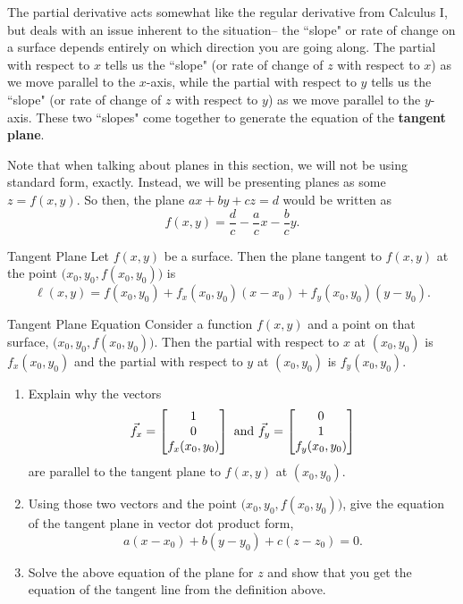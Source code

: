 The partial derivative acts somewhat like the regular derivative from Calculus I, but deals with an issue inherent to the situation-- the ``slope" or rate of change on a surface depends entirely on which direction you are going along. The partial with respect to $x$ tells us the ``slope" (or rate of change of $z$ with respect to $x$) as we move parallel to the $x$-axis, while the partial with respect to $y$ tells us the ``slope" (or rate of change of $z$ with respect to $y$) as we move parallel to the $y$-axis. These two ``slopes" come together to generate the equation of the \textbf{tangent plane}.

Note that when talking about planes in this section, we will not be using standard form, exactly. Instead, we will be presenting planes as some $z=f(x,y)$. So then, the plane $ax+by+cz=d$ would be written as $$f(x,y)=\frac{d}{c}-\frac{a}{c}x-\frac{b}{c}y.$$

\begin{definition}{Tangent Plane}
Let $f(x,y)$ be a surface. Then the plane tangent to $f(x,y)$ at the point $\big(x_0,y_0,f(x_0,y_0)\big)$ is $$\ell(x,y)=f(x_0,y_0)+f_x(x_0,y_0)(x-x_0)+f_y(x_0,y_0)(y-y_0). $$
\end{definition}

\begin{exercise}{Tangent Plane Equation}
Consider a function $f(x,y)$ and a point on that surface, $\big(x_0,y_0,f(x_0,y_0)\big)$. Then the partial with respect to $x$ at $(x_0,y_0)$ is $f_x(x_0,y_0)$ and the partial with respect to $y$ at $(x_0,y_0)$ is $f_y(x_0,y_0)$.
\vspace{1em}
\begin{enumerate}
\item Explain why the vectors $$\vec{f}_x=\begin{bmatrix}1\\0\\f_x(x_0,y_0)\end{bmatrix}\text{ and } \vec{f}_y=\begin{bmatrix}0\\1\\f_y(x_0,y_0)\end{bmatrix}$$
are parallel to the tangent plane to $f(x,y)$ at $(x_0,y_0)$.
\vspace{1em}
\item Using those two vectors and the point $\big(x_0,y_0,f(x_0,y_0)\big)$, give the equation of the tangent plane in vector dot product form, $$a(x-x_0)+b(y-y_0)+c(z-z_0)=0. $$
\item Solve the above equation of the plane for $z$ and show that you get the equation of the tangent line from the definition above.
\end{enumerate}
\end{exercise}

